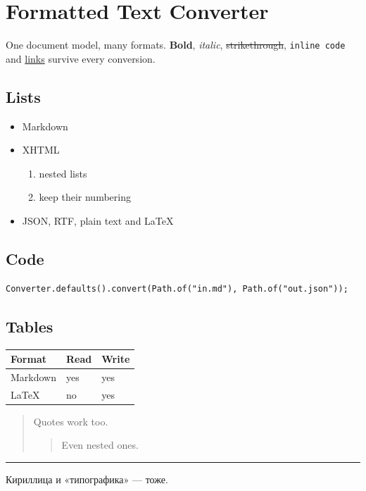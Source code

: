 \documentclass{article}
\begin{document}
\section*{Formatted Text Converter}

One document model, many formats. \textbf{Bold}, \emph{italic}, \sout{strikethrough}, \texttt{inline code} and \href{https://github.com/thbldprncee}{links} survive every conversion.

\subsection*{Lists}

\begin{itemize}
  \item Markdown
  \item XHTML
  
  \begin{enumerate}
    \item nested lists
    \item keep their numbering
  \end{enumerate}
  \item JSON, RTF, plain text and LaTeX
\end{itemize}

\subsection*{Code}

\begin{verbatim}
Converter.defaults().convert(Path.of("in.md"), Path.of("out.json"));
\end{verbatim}

\subsection*{Tables}

\begin{tabular}{|l|l|l|}
\hline
Format & Read & Write \\ \hline
Markdown & yes & yes \\ \hline
LaTeX & no & yes \\ \hline
\end{tabular}

\begin{quote}
Quotes work too.

\begin{quote}
Even nested ones.
\end{quote}
\end{quote}

\noindent\rule{\linewidth}{0.4pt}

Кириллица и «типографика» — тоже.
\end{document}
